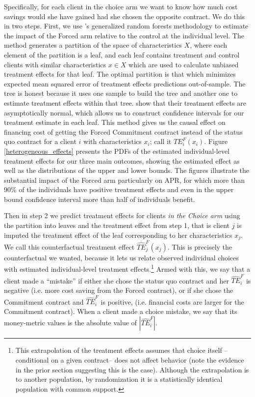 \documentclass[oneside,11pt]{article}
\begin{document}
Specifically, for each client in the choice arm we want to know how much cost savings would she have gained had she chosen the opposite contract. We do this in two steps.  First, we use  \cite{atheygrf}'s generalized random forests methodology to estimate the impact of the Forced arm relative to the control at the individual level.  The method generates a partition of the space of characteristics $X$, where each element of the partition is a leaf, and each leaf contains treatment and control clients with similar characteristics $x \in X$ which are used to calculate unbiased treatment effects for that leaf. The optimal partition is that which minimizes expected mean squared error of treatment effects predictions out-of-sample.  The tree is honest because it uses one sample to build the tree and another one to estimate treatment effects within that tree.  \cite{atheygrf} show that their treatment effects are asymptotically normal, which allows us to construct confidence intervals for our treatment estimate in each leaf. This method gives us the causal effect on financing cost of getting the Forced Commitment contract instead of the status quo contract for a client $i$ with characteristics $x_i$; call it $TE^{F}_{i}(x_i)$.   Figure \ref{heterogeneous_effects} presents the PDFs of the estimated individual-level treatment effects for our three main outcomes, showing the estimated effect as well as the distributions of the upper and lower bounds.  The figures illustrate the substantial impact of the Forced arm particularly on APR, for which more than 90\% of the individuals have positive treatment effects and even in the upper bound confidence interval more than half of individuals benefit.  

Then in step 2 we predict treatment effects for clients \textit{in the Choice arm} using the partition into leaves and the treatment effect from step 1, that is client $j$ is imputed the treatment effect of the leaf corresponding to her characteristics $x_j$. We call this counterfactual treatment effect $\widehat{TE}^{F}_{j}(x_j)$. This is precisely the counterfactual we wanted, because it lets us relate observed individual choices with estimated individual-level treatment effects.\footnote{This extrapolation of the treatment effects assumes that choice itself --conditional on a given contract-- does not affect behavior (note the evidence in the prior section suggesting this is the case).   Although the extrapolation is to another population, by randomization it is a statistically identical population with common support.} Armed with this, we say that a client made a ``mistake'' if either she chose the status quo contract and her $\widehat{TE}^{F}_{i}$ is negative (i.e. more cost saving from the Forced contract), or if she chose the Commitment contract and $\widehat{TE}^{F}_{i}$ is positive, (i.e.  financial costs are larger for the Commitment contract). When a client made a choice mistake, we say that its money-metric values is the absolute value of $|\widehat{TE}^{F}_{i}|$. 
\end{document}

